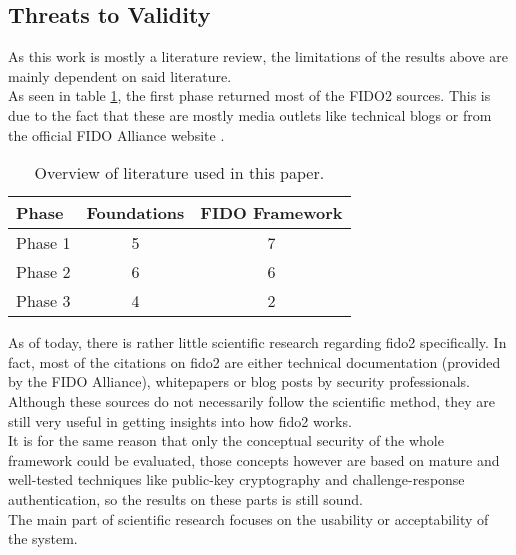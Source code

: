 \subsection{Threats to Validity}
\label{subsec:validity_threats}

As this work is mostly a literature review, the limitations of the results above are mainly dependent on said literature.\\

As seen in table \ref{tab:literature_review}, the first phase returned most of the FIDO2 sources. This is due to the fact that these are mostly media outlets like technical blogs \citep{hunt2018b,leitner2019, chonng2018, ng2019, mingis2020} or from the official FIDO Alliance website \citep{fido2_overview,fido2_webauthn}.

\begin{table}[ht]
    \centering
    \caption{Overview of literature used in this paper.}
    \label{tab:literature_review}
    \begin{tabular}{ l | c | c }
        \textbf{Phase} & \textbf{Foundations} & \textbf{FIDO Framework}\\
        \hline
        Phase 1 & 5 & 7\\
        Phase 2 & 6 & 6\\
        Phase 3 & 4 & 2\\
    \end{tabular}
\end{table}

\noindent As of today, there is rather little scientific research regarding \ac{fido2} specifically. In fact, most of the citations on \ac{fido2} are either technical documentation (provided by the FIDO Alliance), whitepapers or blog posts by security professionals. Although these sources do not necessarily follow the scientific method, they are still very useful in getting insights into how \ac{fido2} works.\\
It is for the same reason that only the conceptual security of the whole framework could be evaluated, those concepts however are based on mature and well-tested techniques like public-key cryptography and challenge-response authentication, so the results on these parts is still sound.\\
The main part of scientific research focuses on the usability or acceptability of the system.